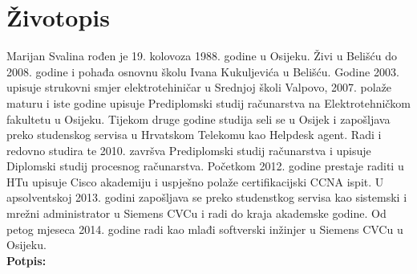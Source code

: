 \newpage
\thispagestyle{empty}

\section*{Životopis} %
\label{sec:Životopis}

Marijan Svalina rođen je 19. kolovoza 1988. godine u Osijeku. Živi u
Belišću do 2008. godine i pohađa osnovnu školu Ivana Kukuljevića u
Belišću. Godine 2003. upisuje strukovni smjer elektrotehiničar u
Srednjoj školi Valpovo, 2007. polaže maturu i iste godine upisuje
Prediplomski studij računarstva na Elektrotehničkom fakultetu u Osijeku.
Tijekom druge godine studija seli se u Osijek i zapošljava preko
studenskog servisa u Hrvatskom Telekomu kao Helpdesk agent. Radi i
redovno studira te 2010. završva Prediplomski studij računarstva i
upisuje Diplomski studij procesnog računarstva. Početkom 2012. godine
prestaje raditi u HTu upisuje Cisco akademiju i uspješno polaže
certifikacijski CCNA ispit. U apsolventskoj 2013. godini zapošljava se
preko studenstkog servisa kao sistemski i mrežni administrator u Siemens
CVCu i radi do kraja akademske godine. Od petog mjeseca 2014. godine
radi kao mlađi softverski inžinjer u Siemens CVCu u Osijeku.
\\[1cm]

\hfill{\textbf{Potpis:}}


